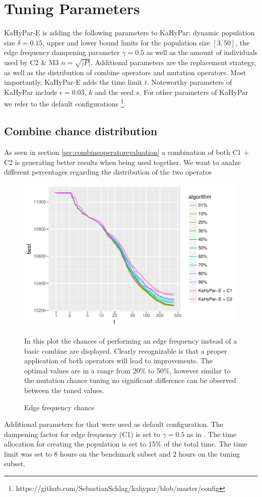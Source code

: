 \documentclass[a4paper,12pt,titlepage, BCOR7mm,headsepline]{scrbook}
\numberwithin{equation}{section}
\begin{document}
\section{Tuning Parameters}
KaHyPar-E is adding the following parameters to KaHyPar: dynamic population size $\delta = 0.15$, upper and lower bound limits for the population size $[3,50]$, the edge frequency dampening parameter $\gamma = 0.5$ as well as the amount of individuals used by C2 \& M3 $n = \sqrt{|P|}$. Additional parameters are the replacement strategy, as well as the distribution of combine operators and mutation operators. Most importantly, KaHyPar-E adds the time limit $t$. Noteworthy parameters of KaHyPar include $\epsilon = 0.03$, $k$ and the seed $s$. For other parameters of KaHyPar we refer to the default configurations \footnote{https://github.com/SebastianSchlag/kahypar/blob/master/config}. 
\subsection{Combine chance distribution}
As seen in section \ref{sec:combineoperatorevaluation} a combination of both C1 + C2 is generating better results when being used together. We want to analze different percentages regarding the distribution of the two operatos
\begin{figure}[H]
\caption{Edge frequency chance}
\begin{center}
\includegraphics{bachelorarbeit-edgefrequencytuning}
\end{center}
In this plot the chances of performing an edge frequency instead of a basic combine are displayed. Clearly recognizable is that a proper application of both operators will lead to improvements. The optimal values are in a range from 20\% to 50\%, however similar to the mutation chance tuning no significant difference can be observed between the tuned values.  
\end{figure}
Additional parameters for that were used as default configuration. The dampening factor for edge frequency (C1) is set to $\gamma = 0.5$ as in \cite{wichlund1998multilevel}. The time allocation for creating the population is set to 15\% of the total time. The time limit was set to 8 hours on the benchmark subset and 2 hours on the tuning subset.
\end{document}
